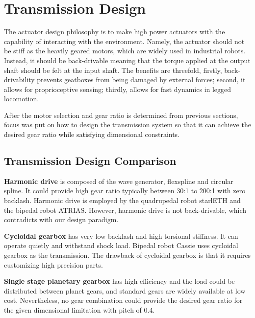 

\section{Transmission Design}
\label{sec:transmissionDesign}

The actuator design philosophy is to make high power actuators with the capability of interacting with the environment. Namely, the actuator should not be stiff as the heavily geared motors, which are widely used in industrial robots. Instead, it should be back-drivable meaning that the torque applied at the output shaft should be felt at the input shaft. The benefits are threefold, firstly, back-drivability prevents geatboxes from being damaged by external forces; second, it allows for proprioceptive sensing\cite{Seok2012}; thirdly, allows for fast dynamics in legged locomotion.

After the motor selection and gear ratio is determined from previous sections, focus was put on how to design the transmission system so that it can achieve the desired gear ratio while satisfying dimensional constraints.

\subsection{Transmission Design Comparison}
\label{sec:transmissionComparison}

\textbf{Harmonic drive} is composed of the wave generator, flexspline and circular spline. It could provide high gear ratio typically between 30:1 to 200:1 with zero backlash. Harmonic drive is employed by the quadrupedal robot starlETH\cite{Hutter2013} and the bipedal robot ATRIAS\cite{Hubicki2016}. However, harmonic drive is not back-drivable, which contradicts with our design paradigm.

\textbf{Cycloidal gearbox} has very low backlash and high torsional stiffness. It can operate quietly and withstand shock load. Bipedal robot Cassie uses cycloidal gearbox as the transmission. The drawback of cycloidal gearbox is that it requires customizing high precision parts.

\textbf{Single stage planetary gearbox} has high efficiency and the load could be distributed between planet gears, and standard gears are widely available at low cost. Nevertheless, no gear combination could provide the desired gear ratio for the given dimensional limitation with pitch of 0.4.

